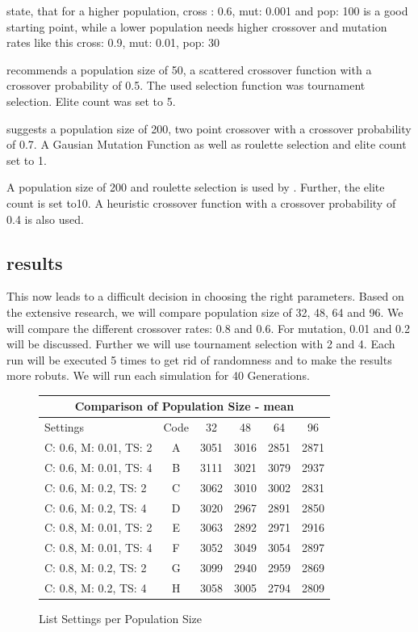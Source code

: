 \cite{srinivas_genetic_1994} state, that for a higher population, cross : 0.6, mut: 0.001 and pop: 100 is a good starting point, while a lower population needs higher crossover and mutation rates like this cross: 0.9, mut: 0.01, pop: 30


\cite{fazal_estimating_2005} recommends a population size of 50, a scattered crossover function with a crossover probability of 0.5. The used selection function was tournament selection. Elite count was set to 5.

\cite{dao_maximising_2016} suggests a population size of 200, two point crossover with a crossover probability of 0.7. A Gausian Mutation Function as well as roulette selection and elite count set to 1.

A population size of 200 and roulette selection is used by \cite{assistant_professor_amity_university_jaipur_rajasthan_india_parameter_2019}. Further, the elite count is set to10. A heuristic crossover function with a crossover probability of 0.4 is also used.

\subsection{results}
This now leads to a difficult decision in choosing the right parameters. Based on the extensive research, we will compare population size of 32, 48, 64 and 96. We will compare the different crossover rates: 0.8 and 0.6. For mutation, 0.01 and 0.2 will be discussed. Further we will use tournament selection with 2 and 4.
Each run will be executed 5 times to get rid of randomness and to make the results more robuts. We will run each simulation for 40 Generations.

\begin{figure}[ht]
	\centering
\begin{tabular}{ |l|c||c|c|c|c|  }
	\hline
	\multicolumn{6}{|c|}{Comparison of Population Size - mean} \\
	\hline
	Settings & Code & 32 & 48 & 64 & 96\\
	\hline
	C: 0.6, M: 0.01, TS: 2   	& A & 3051 & 3016 & 2851 & 2871\\
	C: 0.6, M: 0.01, TS: 4		& B & 3111 & 3021 & 3079 & 2937\\
	C: 0.6, M: 0.2, TS: 2 		& C & 3062 & 3010 & 3002 & 2831\\
	C: 0.6, M: 0.2, TS: 4    	& D & 3020 & 2967 & 2891 & 2850\\
	C: 0.8, M: 0.01, TS: 2   	& E & 3063 & 2892 & 2971 & 2916\\
	C: 0.8, M: 0.01, TS: 4		& F & 3052 & 3049 & 3054 & 2897\\
	C: 0.8, M: 0.2, TS: 2 		& G & 3099 & 2940 & 2959 & 2869\\
	C: 0.8, M: 0.2, TS: 4    	& H & 3058 & 3005 & 2794 & 2809\\
	\hline
\end{tabular}
\caption{List Settings per Population Size}
\end{figure}


